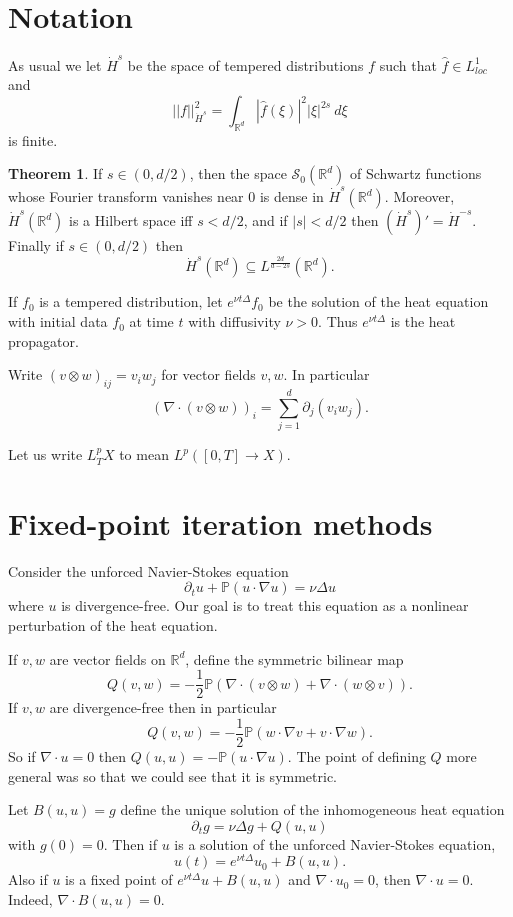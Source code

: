 \documentclass[12pt]{book}
\newcommand{\RR}{\mathbb{R}}
\newcommand{\PP}{\mathbb{P}}
\newcommand{\Sch}{\mathscr S}
\theoremstyle{definition}
\newtheorem{theorem}{Theorem}[chapter]
\begin{document}
\section{Notation}
As usual we let $\dot H^s$ be the space of tempered distributions $f$ such that $\hat f \in L^1_{loc}$ and
$$||f||_{\dot H^s}^2 = \int_{\RR^d} |\hat f(\xi)|^2 |\xi|^{2s} ~d\xi$$
is finite.

\begin{theorem}
If $s \in (0, d/2)$, then the space $\Sch_0(\RR^d)$ of Schwartz functions whose Fourier transform vanishes near $0$ is dense in $\dot H^s(\RR^d)$.
Moreover, $\dot H^s(\RR^d)$ is a Hilbert space iff $s < d/2$, and if $|s| < d/2$ then $(\dot H^s)' = \dot H^{-s}$.
Finally if $s \in (0, d/2)$ then
$$\dot H^s(\RR^d) \subseteq L^{\frac{2d}{d - 2s}}(\RR^d).$$
\end{theorem}

If $f_0$ is a tempered distribution, let $e^{\nu t\Delta} f_0$ be the solution of the heat equation with initial data $f_0$ at time $t$ with diffusivity $\nu > 0$.
Thus $e^{\nu t \Delta}$ is the heat propagator.

Write $(v \otimes w)_{ij} = v_iw_j$ for vector fields $v,w$.
In particular
$$(\nabla \cdot (v \otimes w))_i = \sum_{j=1}^d \partial_j (v_i w_j).$$

Let us write $L^p_TX$ to mean $L^p([0, T] \to X)$.

\section{Fixed-point iteration methods}
Consider the unforced Navier-Stokes equation
$$\partial_t u + \PP(u \cdot \nabla u) = \nu \Delta u$$
where $u$ is divergence-free. Our goal is to treat this equation as a nonlinear perturbation of the heat equation.

If $v, w$ are vector fields on $\RR^d$, define the symmetric bilinear map
$$Q(v, w) = -\frac{1}{2}\PP(\nabla \cdot (v \otimes w) + \nabla \cdot(w \otimes v)).$$
If $v,w$ are divergence-free then in particular
$$Q(v, w) = -\frac{1}{2} \PP(w \cdot \nabla v + v \cdot \nabla w).$$
So if $\nabla \cdot u = 0$ then $Q(u, u) = -\PP(u \cdot \nabla u)$.
The point of defining $Q$ more general was so that we could see that it is symmetric.

Let $B(u, u) = g$ define the unique solution of the inhomogeneous heat equation
$$\partial_t g = \nu \Delta g + Q(u, u)$$
with $g(0) = 0$.
Then if $u$ is a solution of the unforced Navier-Stokes equation,
$$u(t) = e^{\nu t \Delta} u_0 + B(u, u).$$
Also if $u$ is a fixed point of $e^{\nu t \Delta} u + B(u ,u)$ and $\nabla \cdot u_0 = 0$, then $\nabla \cdot u = 0$.
Indeed, $\nabla \cdot B(u, u) = 0$.
\end{document}
